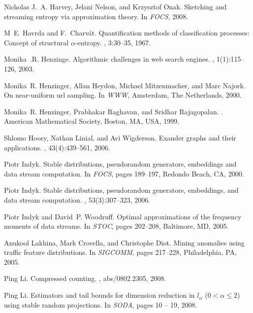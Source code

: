 \documentclass{sig-alternate}
\begin{document}
\begin{thebibliography}{10}
Nicholas J.~A. Harvey, Jelani Nelson, and Krzysztof Onak.
\newblock Sketching and streaming entropy via approximation theory.
\newblock In {\em FOCS}, 2008.

M~E. Havrda and F.~Charv\'at.
\newblock Quantification methods of classification processes: Concept of
  structural $\alpha$-entropy.
, 3:30--35, 1967.

Monika~.R. Henzinge.
\newblock Algorithmic challenges in web search engines.
, 1(1):115--126, 2003.

Monika~R. Henzinger, Allan Heydon, Michael Mitzenmacher, and Marc Najork.
\newblock On near-uniform url sampling.
\newblock In {\em WWW}, Amsterdam, The Netherlands, 2000.

Monika~R. Henzinger, Prabhakar Raghavan, and Sridhar Rajagopalan.
.
\newblock American Mathematical Society, Boston, MA, USA, 1999.

Shlomo Hoory, Nathan Linial, and Avi Wigderson.
\newblock Exander graphs and their applications.
, 43(4):439--561, 2006.

Piotr Indyk.
\newblock Stable distributions, pseudorandom generators, embeddings and data
  stream computation.
\newblock In {\em FOCS}, pages 189--197, Redondo Beach, CA, 2000.

Piotr Indyk.
\newblock Stable distributions, pseudorandom generators, embeddings, and data
  stream computation.
, 53(3):307--323, 2006.

Piotr Indyk and David~P. Woodruff.
\newblock Optimal approximations of the frequency moments of data streams.
\newblock In {\em STOC}, pages 202--208, Baltimore, MD, 2005.

Anukool Lakhina, Mark Crovella, and Christophe Diot.
\newblock Mining anomalies using traffic feature distributions.
\newblock In {\em SIGCOMM}, pages 217--228, Philadelphia, PA, 2005.

Ping Li.
\newblock Compressed counting.
, abs/0802.2305, 2008.

Ping Li.
\newblock Estimators and tail bounds for dimension reduction in $l_\alpha$
  ($0<\alpha\leq 2$) using stable random projections.
\newblock In {\em SODA}, pages 10 -- 19, 2008.


\end{thebibliography}
\end{document}

